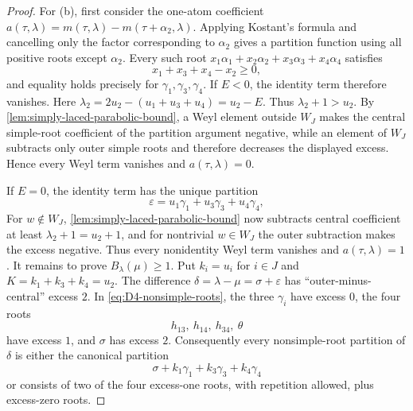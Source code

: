 \documentclass[11pt]{article}
\theoremstyle{definition}
\theoremstyle{remark}
\begin{document}
\begin{proof}
For (b), first consider the one-atom coefficient
$a(\tau,\lambda)=m(\tau,\lambda)-m(\tau+\alpha_2,\lambda)$.  Applying
Kostant's formula and cancelling only the factor corresponding to
$\alpha_2$ gives a partition function using all positive roots except
$\alpha_2$.  Every such root
$x_1\alpha_1+x_2\alpha_2+x_3\alpha_3+x_4\alpha_4$ satisfies
\[
       x_1+x_3+x_4-x_2\ge0,
\]
and equality holds precisely for $\gamma_1,\gamma_3,\gamma_4$.
If $E<0$, the identity term therefore vanishes.  Here
$\lambda_2=2u_2-(u_1+u_3+u_4)=u_2-E$.  Thus
$\lambda_2+1>u_2$.  By \cref{lem:simply-laced-parabolic-bound}, a Weyl element outside
$W_J$ makes the central simple-root coefficient of the partition argument negative, while
an element of $W_J$ subtracts only outer simple roots and therefore decreases
the displayed excess.  Hence every Weyl term vanishes and
$a(\tau,\lambda)=0$.

If $E=0$, the identity term has the unique partition
\[
       \varepsilon=u_1\gamma_1+u_3\gamma_3+u_4\gamma_4,
\]
For $w\notin W_J$, \cref{lem:simply-laced-parabolic-bound} now subtracts central
coefficient at least $\lambda_2+1=u_2+1$, and for nontrivial $w\in W_J$ the
outer subtraction makes the excess negative.  Thus every nonidentity Weyl
term vanishes and $a(\tau,\lambda)=1$.
It remains to prove $B_\lambda(\mu)\ge1$.  Put
$k_i=u_i$ for $i\in J$ and $K=k_1+k_3+k_4=u_2$.  The difference
$\delta=\lambda-\mu=\sigma+\varepsilon$ has ``outer-minus-central'' excess
$2$.  In \eqref{eq:D4-nonsimple-roots}, the three $\gamma_i$ have excess
$0$, the four roots
\[
      h_{13},\ h_{14},\ h_{34},\ \theta
\]
have excess $1$, and $\sigma$ has excess $2$.  Consequently every
nonsimple-root partition of $\delta$ is either the canonical partition
\[
      \sigma+k_1\gamma_1+k_3\gamma_3+k_4\gamma_4
\]
or consists of two of the four excess-one roots, with repetition allowed,
plus excess-zero roots.


\end{proof}
\end{document}
